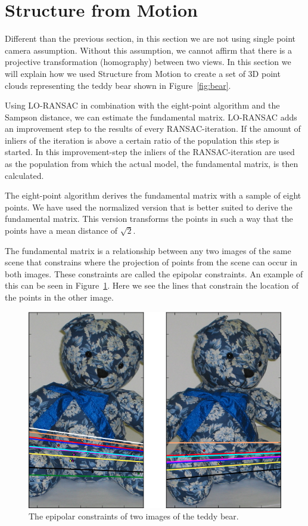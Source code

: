 \section{Structure from Motion}
\label{structure}
Different than the previous section, in this section we are not using single point camera assumption.
Without this assumption, we cannot affirm that there is a projective transformation (homography) between two views.
In this section we will explain how we used Structure from Motion\cite{SfM} to create a set of 3D point clouds
representing the teddy bear shown in Figure~\ref{fig:bear}.

Using LO-RANSAC\cite{ransac} in combination with the eight-point algorithm\cite{eightpoint} and the Sampson distance,
we can estimate the fundamental matrix.
LO-RANSAC adds an improvement step to the results of every RANSAC-iteration.
If the amount of inliers of the iteration is above a certain ratio of the population this step is started.
In this improvement-step the inliers of the RANSAC-iteration are used as the population from which the actual model,
the fundamental matrix, is then calculated.

The eight-point algorithm derives the fundamental matrix with a sample of eight points.
We have used the normalized version that is better suited to derive the fundamental matrix.
This version transforms the points in such a way that the points have a mean distance of $\sqrt{2}$.

The fundamental matrix is a relationship between any two images of the same scene that constrains
where the projection of points from the scene can occur in both images.
These constraints are called the epipolar constraints.
An example of this can be seen in Figure~\ref{fig:epipolar}.
Here we see the lines that constrain the location of the points in the other image.
\begin{figure}[ht]
	\centering
	\includegraphics[width=.5\textwidth]{bear_epi}
	\caption{The epipolar constraints of two images of the teddy bear.}
	\label{fig:epipolar}
\end{figure}

